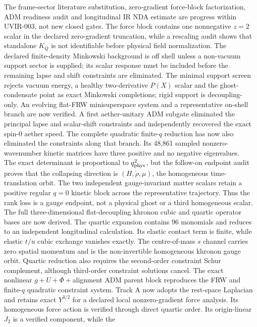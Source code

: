 The frame-sector literature substitution, zero-gradient force-block
factorization, ADM readiness audit and longitudinal IR NDA estimate are
progress within UVIR-003, not new closed gates.  The force block contains one
nonnegative $z=2$ scalar in the declared zero-gradient truncation, while a
rescaling audit shows that standalone $K_Q$ is not identifiable before
physical field normalization.  The declared finite-density Minkowski
background is off shell unless a non-vacuum support sector is supplied; its
scalar response must be included before the remaining lapse and shift
constraints are eliminated.  The minimal support screen rejects vacuum
energy, a healthy two-derivative $P(X)$ scalar and the ghost-condensate point
as exact Minkowski completions; rigid support is decoupling-only.  An evolving
flat-FRW minisuperspace system and a representative on-shell branch are now
verified.  A first aether-unitary ADM subgate eliminated the principal lapse
and scalar-shift constraints and independently recovered the exact spin-0
aether speed.  The complete quadratic finite-$q$ reduction has now also
eliminated the constraints along that branch.  Its 48,861 sampled
nonzero-wavenumber kinetic matrices have three positive and no negative
eigenvalues.  The exact determinant is proportional to $q_{\rm phys}^2$, but
the follow-on endpoint audit proves that the collapsing direction is
$(H,\dot\rho,\mu)$, the homogeneous time-translation orbit.  The two
independent gauge-invariant matter scalars retain a positive regular $q=0$
kinetic block across the representative trajectory.  Thus the rank loss is a
gauge endpoint, not a physical ghost or a third homogeneous scalar.  The full
three-dimensional flat-decoupling khronon cubic and quartic operator bases are
now derived.  The quartic expansion contains 96 monomials and reduces to an
independent longitudinal calculation.  Its elastic contact term is finite,
while elastic $t/u$ cubic exchange vanishes exactly.  The centre-of-mass
$s$ channel carries zero spatial momentum and is the non-invertible homogeneous
khronon gauge orbit.  Quartic reduction also requires the second-order
constraint Schur complement, although third-order constraint solutions cancel.
The exact nonlinear $g+U+\Phi+$alignment ADM parent block reproduces the FRW
and finite-$q$ quadratic constraint system.  Track A now adopts the rest-space
Laplacian and retains exact $Y^{3/2}$ for a declared local nonzero-gradient
force analysis.  Its homogeneous force action is verified through direct
quartic order.  Its origin-linear $J_2$ is a verified component, while the
